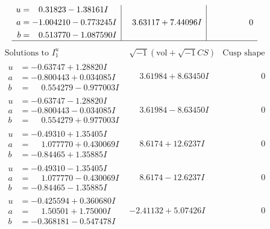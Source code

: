 \documentclass[1p]{elsarticle_modified}
\theoremstyle{definition}
\newcommand{\I}{\sqrt{-1}}
\begin{document}
$$\begin{array}{c|c|c}
\begin{aligned}
u &= \phantom{-}0.31823 - 1.38161 I \\
a &= -1.004210 - 0.773245 I \\
b &= \phantom{-}0.513770 - 1.087590 I\end{aligned}
 & \phantom{-}3.63117 + 7.44096 I & \phantom{-0.000000 } 0\\
 \hline 
 \end{array}$$\newpage$$\begin{array}{c|c|c}  
\text{Solutions to }I^u_{1}& \I (\text{vol} + \sqrt{-1}CS) & \text{Cusp shape}\\
 \hline 
\begin{aligned}
u &= -0.63747 + 1.28820 I \\
a &= -0.800443 + 0.034085 I \\
b &= \phantom{-}0.554279 - 0.977003 I\end{aligned}
 & \phantom{-}3.61984 + 8.63450 I & \phantom{-0.000000 } 0 \\ \hline\begin{aligned}
u &= -0.63747 - 1.28820 I \\
a &= -0.800443 - 0.034085 I \\
b &= \phantom{-}0.554279 + 0.977003 I\end{aligned}
 & \phantom{-}3.61984 - 8.63450 I & \phantom{-0.000000 } 0 \\ \hline\begin{aligned}
u &= -0.49310 + 1.35405 I \\
a &= \phantom{-}1.077770 + 0.430069 I \\
b &= -0.84465 + 1.35885 I\end{aligned}
 & \phantom{-}8.6174 + 12.6237 I & \phantom{-0.000000 } 0 \\ \hline\begin{aligned}
u &= -0.49310 - 1.35405 I \\
a &= \phantom{-}1.077770 - 0.430069 I \\
b &= -0.84465 - 1.35885 I\end{aligned}
 & \phantom{-}8.6174 - 12.6237 I & \phantom{-0.000000 } 0 \\ \hline\begin{aligned}
u &= -0.425594 + 0.360680 I \\
a &= \phantom{-}1.50501 + 1.75000 I \\
b &= -0.368181 - 0.547478 I\end{aligned}
 & -2.41132 + 5.07426 I & \phantom{-0.000000 } 0 \\ \hline\begin{aligned}

\end{aligned}
\end{array}$$
\end{document}
